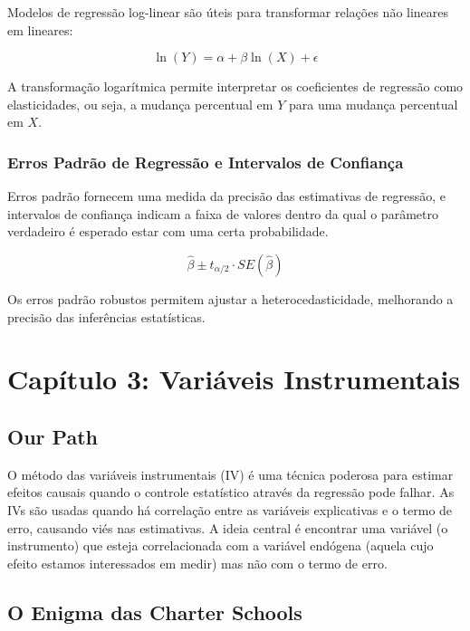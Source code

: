 \documentclass[a4paper,12pt]{article}[abntex2]
\begin{document}
Modelos de regressão log-linear são úteis para transformar relações não lineares em lineares:

\begin{equation}
    \ln(Y) = \alpha + \beta \ln(X) + \epsilon
\end{equation}

A transformação logarítmica permite interpretar os coeficientes de regressão como elasticidades, ou seja, a mudança percentual em \(Y\) para uma mudança percentual em \(X\).

\subsubsection*{Erros Padrão de Regressão e Intervalos de Confiança}

Erros padrão fornecem uma medida da precisão das estimativas de regressão, e intervalos de confiança indicam a faixa de valores dentro da qual o parâmetro verdadeiro é esperado estar com uma certa probabilidade.

\begin{equation}
    \hat{\beta} \pm t_{\alpha/2} \cdot SE(\hat{\beta})
\end{equation}

Os erros padrão robustos permitem ajustar a heterocedasticidade, melhorando a precisão das inferências estatísticas.

\newpage

\section{Capítulo 3: Variáveis Instrumentais}

\subsection*{Our Path}

O método das variáveis instrumentais (IV) é uma técnica poderosa para estimar efeitos causais quando o controle estatístico através da regressão pode falhar. As IVs são usadas quando há correlação entre as variáveis explicativas e o termo de erro, causando viés nas estimativas. A ideia central é encontrar uma variável (o instrumento) que esteja correlacionada com a variável endógena (aquela cujo efeito estamos interessados em medir) mas não com o termo de erro.

\subsection{O Enigma das Charter Schools}
\end{document}
